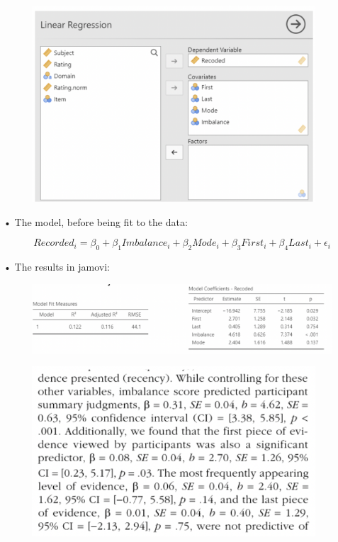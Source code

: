 \documentclass[
  letterpaper,
  DIV=11,
  numbers=noendperiod]{scrreprt}
\begin{document}
\begin{figure}

{\centering \includegraphics[width=4.16667in,height=\textheight]{images/Mod2_pt1_8.png}

}

\end{figure}

• The model, before being fit to the data:

\[
Recorded_i = \beta_0 + \beta_1Imbalance_i + \beta_2Mode_i + \beta_3First_i + \beta_4Last_i + \epsilon_i
\]

• The results in jamovi:

\begin{figure}

{\centering \includegraphics{images/Mod2_pt1_9.png}

}

\end{figure}

\begin{figure}

{\centering \includegraphics[width=4.16667in,height=\textheight]{images/Mod2_pt1_10.png}

}

\end{figure}
\end{document}
